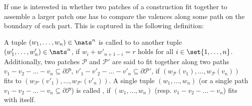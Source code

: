 If one is interested in whether two patches of a construction fit together to assemble a larger patch one has to compare the valences along some path on the boundary of each part. This is captured in the following definition:
\begin{definition}
  A tuple $(w_1, \dots, w_n) \in \nats^n$ is called to  to another tuple $(w'_1, \dots, w'_n) \in \nats^n$, if $w_i + w'_{n+1-i} = r$ holds for all $i \in \set{1, \dots, n}$. Additionally, two patches $\mathcal{P}$ and $\mathcal{P}'$ are said to fit together along two paths $v_1 - v_2 - \dots - v_n \subseteq \partial\mathcal{P}$, $v'_1 - v'_2 - \dots - v'_n \subseteq \partial\mathcal{P'}$, if $(w_{\mathcal{P}}(v_1), \dots, w_{\mathcal{P}}(v_n))$ fits to $(w_{\mathcal{P'}}(v'_1), \dots, w_{\mathcal{P'}}(v'_n))$. A single tuple $(w_1, \dots, w_n)$ (or a single path $v_1 - v_2 - \dots - v_n \subseteq \partial\mathcal{P}$) is called , if $(w_1, \dots, w_n)$ (resp. $v_1 - v_2 - \dots - v_n$) fits with itself.
\end{definition}

